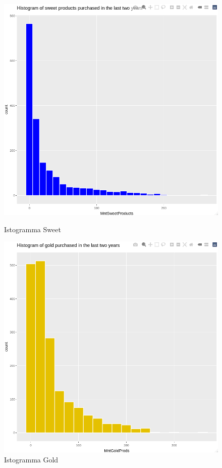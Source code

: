 \documentclass[letterpaper,11pt]{article}
\begin{document}
\begin{figure}[H]
  \centering
  \begin{minipage}[b]{0.4\textwidth}
    \includegraphics[width=\textwidth]{Img/EDA/EDA052.png}
    \caption{Istogramma Sweet}
     \label{fig:IstogrammaSweet}
  \end{minipage}
  \hfill
  \begin{minipage}[b]{0.4\textwidth}
    \includegraphics[width=\textwidth]{Img/EDA/EDA053.png}
    \caption{Istogramma Gold}
     \label{fig:IstogrammaGold}
  \end{minipage}
\end{figure}
\end{document}
